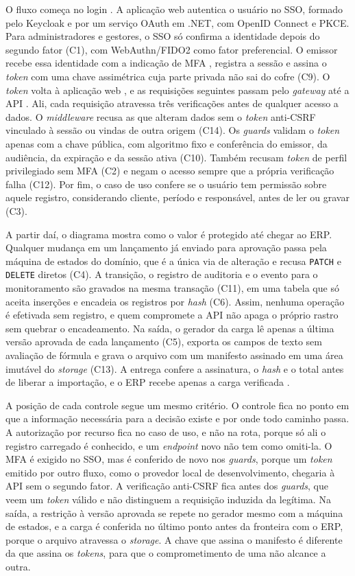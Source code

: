 \documentclass[conference]{IEEEtran}
\newcommand{\passo}[1]{\ding{\numexpr171+#1\relax}} %
\begin{document}
O fluxo começa no login \passo{1}. A aplicação web autentica o usuário no SSO, formado pelo Keycloak e por um serviço OAuth em .NET, com OpenID Connect e PKCE. Para administradores e gestores, o SSO só confirma a identidade depois do segundo fator (C1), com WebAuthn/FIDO2 como fator preferencial. O emissor recebe essa identidade com a indicação de MFA \passo{2}, registra a sessão e assina o \textit{token} com uma chave assimétrica cuja parte privada não sai do cofre (C9). O \textit{token} volta à aplicação web \passo{3}, e as requisições seguintes passam pelo \textit{gateway} \passo{4} até a API \passo{5}. Ali, cada requisição atravessa três verificações antes de qualquer acesso a dados. O \textit{middleware} recusa as que alteram dados sem o \textit{token} anti-CSRF vinculado à sessão ou vindas de outra origem (C14). Os \textit{guards} validam o \textit{token} apenas com a chave pública, com algoritmo fixo e conferência do emissor, da audiência, da expiração e da sessão ativa (C10). Também recusam \textit{token} de perfil privilegiado sem MFA (C2) e negam o acesso sempre que a própria verificação falha (C12). Por fim, o caso de uso confere se o usuário tem permissão sobre aquele registro, considerando cliente, período e responsável, antes de ler ou gravar \passo{6} (C3).

A partir daí, o diagrama mostra como o valor é protegido até chegar ao ERP. Qualquer mudança em um lançamento já enviado para aprovação passa pela máquina de estados do domínio, que é a única via de alteração e recusa \texttt{PATCH} e \texttt{DELETE} diretos (C4). A transição, o registro de auditoria e o evento para o monitoramento são gravados na mesma transação \passo{7} (C11), em uma tabela que só aceita inserções e encadeia os registros por \textit{hash} (C6). Assim, nenhuma operação é efetivada sem registro, e quem compromete a API não apaga o próprio rastro sem quebrar o encadeamento. Na saída, o gerador da carga lê apenas a última versão aprovada de cada lançamento (C5), exporta os campos de texto sem avaliação de fórmula e grava o arquivo com um manifesto assinado em uma área imutável do \textit{storage} (C13). A entrega confere a assinatura, o \textit{hash} e o total antes de liberar a importação, e o ERP recebe apenas a carga verificada \passo{8}.

A posição de cada controle segue um mesmo critério. O controle fica no ponto em que a informação necessária para a decisão existe e por onde todo caminho passa. A autorização por recurso fica no caso de uso, e não na rota, porque só ali o registro carregado é conhecido, e um \textit{endpoint} novo não tem como omiti-la. O MFA é exigido no SSO, mas é conferido de novo nos \textit{guards}, porque um \textit{token} emitido por outro fluxo, como o provedor local de desenvolvimento, chegaria à API sem o segundo fator. A verificação anti-CSRF fica antes dos \textit{guards}, que veem um \textit{token} válido e não distinguem a requisição induzida da legítima. Na saída, a restrição à versão aprovada se repete no gerador mesmo com a máquina de estados, e a carga é conferida no último ponto antes da fronteira com o ERP, porque o arquivo atravessa o \textit{storage}. A chave que assina o manifesto é diferente da que assina os \textit{tokens}, para que o comprometimento de uma não alcance a outra.
\end{document}
